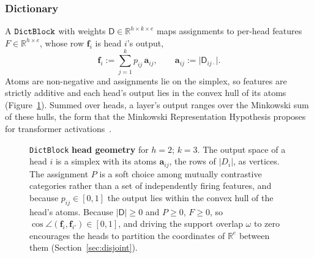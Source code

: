 \subsubsection{Dictionary}
\label{sec:dict}
A $\mathop{\mathtt{DictBlock}}\limits$ with weights $\mathsf{D} \in \mathbb{R}^{h \times k \times e}$
maps assignments to per-head features $F \in \mathbb{R}^{h \times e}$,
whose row $\mathbf{f}_i$ is head $i$'s output,
\begin{equation}
	\mathbf{f}_i :=
	\sum^{k}_{j=1} p_{ij}\,\mathbf{a}_{ij},
	\qquad
	\mathbf{a}_{ij} := \lvert \mathsf{D}_{ij\cdot}\rvert .
	\label{eq:dictblock}
\end{equation}
Atoms are non-negative and assignments lie on the simplex, so features
are strictly additive and each head's output lies in the convex hull of
its atoms (Figure~\ref{fig:head-simplex}). Summed over heads, a layer's
output ranges over the Minkowski sum of these hulls, the form that the
Minkowski Representation Hypothesis proposes for transformer
activations~\cite{fel2026rabbit}.

\begin{figure}[tp]
\centering

\caption[Per-head geometry]{\texttt{DictBlock} \textbf{head geometry} for $h{=}2$; $k{=}3$.
	The output space of a head $i$ is a simplex with its atoms
	$\mathbf{a}_{ij}$, the rows of $\lvert D_i\rvert$, as vertices. The assignment $P$ is a soft
	choice among mutually contrastive categories rather than a set of
	independently firing features, and because $p_{ij} \in [0,1]$ the
	output lies within the convex hull of the head's atoms.
	Because $\lvert \mathsf{D}\rvert\geq0$ and $P\geq0$, $F\geq0$, so
	$\cos\angle(\mathbf{f}_i, \mathbf{f}_{i'}) \in [0,1]$, and driving the support overlap $\omega$
	to zero encourages the heads to partition the coordinates of $\mathbb{R}^e$
	between them (Section~\ref{sec:disjoint}).
}
\label{fig:head-simplex}
\end{figure}

